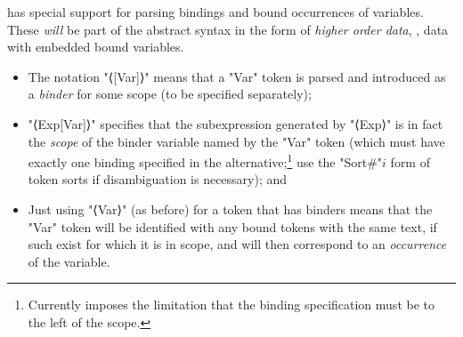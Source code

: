 \documentclass[11pt]{article} %
\begin{document}
\begin{notation}\label{nota:binder-sorts}
  \HAX has special support for parsing bindings and bound occurrences of variables. These
  \emph{will} be part of the abstract syntax in the form of \emph{higher order data}, \ie, data with
  embedded bound variables.
  \begin{itemize}

  \item The notation "⟨[Var]⟩" means that a "Var" token is parsed and introduced as a
    \emph{binder} for some scope (to be specified separately);

  \item "⟨Exp[Var]⟩" specifies that the subexpression generated by "⟨Exp⟩" is in fact the
    \emph{scope} of the binder variable named by the "Var" token (which must have exactly one
    binding specified in the alternative;\footnote{Currently \HAX imposes the limitation that the
      binding specification must be to the left of the scope.} use the "Sort#"$i$ form of token
    sorts if disambiguation is necessary); and 

  \item Just using "⟨Var⟩" (as before) for a token that has binders means that the "Var" token will
    be identified with any bound tokens with the same text, if such exist for which it is in scope,
    and will then correspond to an \emph{occurrence} of the variable.

  \end{itemize}
\end{notation}
\end{document}
